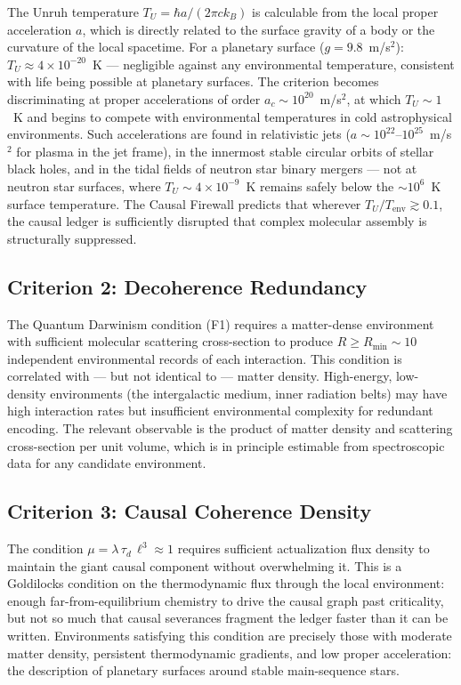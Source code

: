\documentclass[11pt,a4paper]{article}
\theoremstyle{plain}
\theoremstyle{definition}
\theoremstyle{remark}
\begin{document}
The Unruh temperature $T_U = \hbar a / (2\pi c k_B)$ is calculable from
the local proper acceleration $a$, which is directly related to the
surface gravity of a body or the curvature of the local spacetime.
For a planetary surface ($g = 9.8$~m/s$^2$):
$T_U \approx 4 \times 10^{-20}$~K --- negligible against any environmental
temperature, consistent with life being possible at planetary surfaces.
The criterion becomes discriminating at proper accelerations of order
$a_c \sim 10^{20}$~m/s$^2$, at which $T_U \sim 1$~K and begins to compete
with environmental temperatures in cold astrophysical environments. Such
accelerations are found in relativistic jets ($a \sim 10^{22}$--$10^{25}$~m/s$^2$
for plasma in the jet frame), in the innermost stable circular orbits of stellar
black holes, and in the tidal fields of neutron star binary mergers --- not at
neutron star surfaces, where $T_U \sim 4 \times 10^{-9}$~K remains safely
below the $\sim 10^6$~K surface temperature. The Causal Firewall predicts
that wherever $T_U / T_{\mathrm{env}} \gtrsim 0.1$, the causal ledger is
sufficiently disrupted that complex molecular assembly is structurally
suppressed.

\subsection{Criterion 2: Decoherence Redundancy}

The Quantum Darwinism condition (F1) requires a matter-dense environment
with sufficient molecular scattering cross-section to produce $R \geq
R_{\min} \sim 10$ independent environmental records of each interaction.
This condition is correlated with --- but not identical to --- matter
density. High-energy, low-density environments (the intergalactic medium,
inner radiation belts) may have high interaction rates but insufficient
environmental complexity for redundant encoding. The relevant observable
is the product of matter density and scattering cross-section per unit
volume, which is in principle estimable from spectroscopic data for
any candidate environment.

\subsection{Criterion 3: Causal Coherence Density}

The condition $\mu = \lambda\,\tau_d\,\ell^3 \approx 1$ requires sufficient
actualization flux density to maintain the giant causal component without
overwhelming it. This is a Goldilocks condition on the thermodynamic flux
through the local environment: enough far-from-equilibrium chemistry to
drive the causal graph past criticality, but not so much that causal
severances fragment the ledger faster than it can be written. Environments
satisfying this condition are precisely those with moderate matter density,
persistent thermodynamic gradients, and low proper acceleration: the
description of planetary surfaces around stable main-sequence stars.
\end{document}
